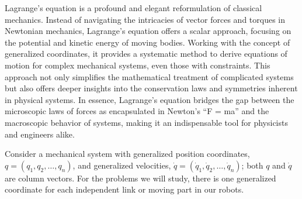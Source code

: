 Lagrange's equation is a profound and elegant reformulation of classical mechanics. Instead of navigating the intricacies of vector forces and torques in Newtonian mechanics, Lagrange's equation offers a scalar approach, focusing on the potential and kinetic energy of moving bodies. Working with the concept of generalized coordinates, it provides a systematic method to derive equations of motion for complex mechanical systems, even those with constraints. This approach not only simplifies the mathematical treatment of complicated systems but also offers deeper insights into the conservation laws and symmetries inherent in physical systems. In essence, Lagrange's equation bridges the gap between the microscopic laws of forces as encapsulated in Newton's ``F = ma'' and the macroscopic behavior of systems, making it an indispensable tool for physicists and engineers alike.

Consider a mechanical system with generalized position coordinates, $q = (q_1, q_2, \ldots, q_n)$, and generalized velocities, $\dot{q} = (\dot{q}_1, \dot{q}_2, \ldots, \dot{q}_n)$; both $q$ and $\dot{q}$ are column vectors. For the problems we will study, there is one generalized coordinate for each independent link or moving part in our robots.


